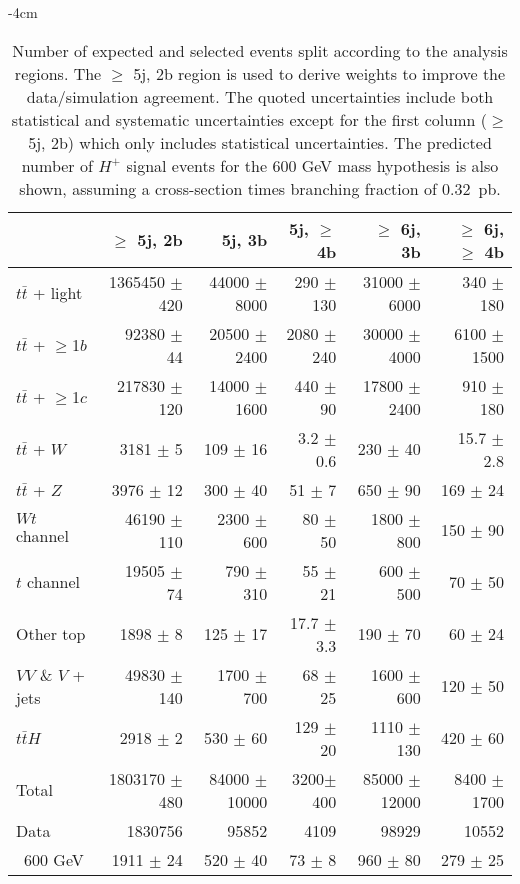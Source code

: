 \begin{table}[htb]
    \small
    \addtolength{\leftskip} {-4cm} %
    \addtolength{\rightskip}{-4cm}
    \centering
    \begin{tabular}{l r r r r r}
        \toprule\toprule
          & $\geq$ 5j, 2b & {5j, 3b} & {5j, $\geq$ 4b} & {$\geq$ 6j, 3b} & {$\geq$ 6j, $\geq$ 4b}\\
          \midrule 
  $t\bar{t}$ + light        & 1365450 $\pm$ 420 & 44000 $\pm$ 8000  & 290 $\pm$ 130  & 31000 $\pm$ 6000  & 340 $\pm$ 180 \\ 
  $t\bar{t}$ + $\geq$1$b$   & 92380   $\pm$ 44 & 20500  $\pm$ 2400  & 2080 $\pm$ 240 & 30000 $\pm$ 4000  & 6100 $\pm$ 1500   \\ 
  $t\bar{t}$ + $\geq$1$c$   & 217830  $\pm$ 120 & 14000 $\pm$ 1600  & 440 $\pm$ 90   & 17800 $\pm$ 2400  & 910  $\pm$ 180   \\ 
  $t\bar{t}$ + $W$          & 3181    $\pm$ 5   & 109   $\pm$ 16    & 3.2 $\pm$ 0.6  & 230   $\pm$ 40    & 15.7   $\pm$ 2.8 \\ 
  $t\bar{t}$ + $Z$          & 3976    $\pm$ 12  & 300   $\pm$ 40    & 51  $\pm$ 7    & 650   $\pm$ 90    & 169  $\pm$ 24 \\ 
  $Wt$ channel              & 46190   $\pm$ 110 & 2300  $\pm$ 600   & 80  $\pm$ 50   & 1800  $\pm$ 800   & 150  $\pm$ 90 \\ 
  $t$ channel               & 19505   $\pm$ 74  & 790   $\pm$ 310   & 55  $\pm$ 21   & 600   $\pm$ 500   & 70   $\pm$ 50 \\ 
  Other top         & 1898    $\pm$ 8   & 125   $\pm$ 17    & 17.7  $\pm$ 3.3    & 190   $\pm$ 70    & 60   $\pm$ 24 \\ 
  $VV$ \& $V$ + jets        & 49830   $\pm$ 140 & 1700  $\pm$ 700   & 68  $\pm$ 25   & 1600  $\pm$ 600   & 120  $\pm$ 50 \\ 
  $t\bar{t}H$               & 2918    $\pm$ 2   & 530   $\pm$ 60    & 129 $\pm$ 20   & 1110  $\pm$ 130   & 420  $\pm$ 60 \\ 
\midrule      
  Total                     &1803170 $\pm$ 480 & 84000 $\pm$ 10000 & 3200$\pm$ 400 & 85000 $\pm$ 12000 & 8400 $\pm$ 1700 \\
\midrule
  Data                      &1830756           & 95852             & 4109          & 98929          & 10552 \\
\midrule  
\midrule\ 600 GeV             & 1911 $\pm$ 24   & 520 $\pm$ 40      & 73 $\pm$ 8    & 960 $\pm$ 80   & 279 $\pm$ 25  \\   
\bottomrule\bottomrule                               
    \end{tabular}
    \caption{Number of expected and selected events split according to the analysis regions. The $\geq$ 5j, 2b region is used to derive weights to improve the data/simulation agreement. The quoted uncertainties include both statistical and systematic uncertainties except for the first column ($\geq$ 5j, 2b) which only includes statistical uncertainties. The predicted number of $H^+$ signal events for the 600 GeV mass hypothesis is also shown, assuming a cross-section times branching fraction of 0.32~pb.}
    \label{Hplustb:prefityields}
\end{table}


